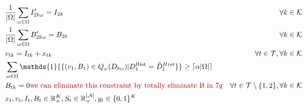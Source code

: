 \documentclass[10pt]{article}
\newcommand{\ti}{t} %
\newcommand{\TI}{\mathcal{T}}
\newcommand{\ka}{k} %
\newcommand{\KA}{\mathcal{K}}
\newcommand{\Ka}{K}
\newcommand{\jey}{j} %
\newcommand{\Graf}{\mathcal{A}} %
\newcommand{\Bi}{B} %
\newcommand{\Vi}{v} %
\newcommand{\m}{\omega} %
\newcommand{\Em}{|\Omega|} %
\newcommand{\EM}{\Omega} %
\newcommand{\Csub}{\mathcal{K}^+_k}
\newcommand{\Psub}{\mathcal{K}^-_k}
\newcommand{\cred}{\color{red!65!black}}
\begin{document}
\begin{subequations}
\begin{flalign}
& \frac{1}{\Em} \sum_{\m \in \EM} I'_{2 \ka \m} = I_{2 \ka} &\forall \ka \in \KA & \label{eq:Average_Inventory} \\
& \frac{1}{\Em} \sum_{\m \in \EM} B'_{2 \ka \m} = B_{2 \ka} &\forall \ka \in \KA & \label{eq:Average_Backlog}\\
& v_{\ti \ka} = I_{\ti \ka} + x_{\ti \ka}  \quad &\forall \ti  \in \TI,\forall \ka \in \KA & \label{eq:Chance_OrderUpTo} \\
& \sum_ {\m \in \EM}  \mathds{1} {\{ ({\Vi}_{1}, {\Bi}_{1} ) \in Q_\m(D_{\ka \m} )| D^\text{Hist}_{1} = \hat{D}^{Hist}_1}  \} \geq \lceil \alpha |\EM|  \rceil& \label{eq:chance_ServiceLevel}\\
&\Bi_{\ti \ka} =0 {\cred\text{we can eliminate this constraint by totally eliminate B in 7g}}& \forall \ti \in \TI \setminus\{1,2\}, \forall \ka \in \KA &\label{eq:chance_Back}\\
&{x}_{ \ti },  {v}_{ \ti },  {I}_{ \ti} , {\Bi}_{ \ti } \in \mathbb{R}_{+}^{\Ka} , {S}_{\ti} \in \mathbb{R}_{+}^{|\Graf|} ,{y}_{ \ti } \in \{0,1\}^{\Ka} & \label{eq:Sub_FD_bound3}
\end{flalign}

  \end{subequations}
  
\end{document}
